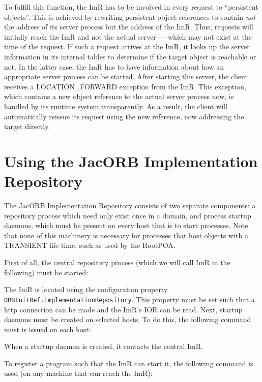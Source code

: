 \documentclass[12pt]{scrbook}
\begin{document}
To fulfill this function, the ImR  has to be involved in every request
to ``persistent  objects''.  This is achieved  by rewriting persistent
object  references to  contain {\em  not}  the address  of its  server
process but  the address  of the ImR.   Thus, requests  will initially
reach the ImR and not the actual server --- which may not exist at the
time of the request. If such a request arrives at the ImR, it looks up
the  server information  in its  internal tables  to determine  if the
target object is reachable or not.  In the latter case, the ImR has to
have  information  about how  an  appropriate  server  process can  be
started.   After   starting  this   server,  the  client   receives  a
LOCATION\_FORWARD  exception  from  the  ImR.  This  exception,  which
contains a new  object reference to the actual  server process now, is
handled by its runtime system  transparently.  As a result, the client
will automatically  reissue its request  using the new  reference, now
addressing the target directly.

\section{Using the JacORB Implementation Repository}

The  JacORB   Implementation  Repository  consists   of  two  separate
components:  a repository  process which  need  only exist  once in  a
domain, and  process startup daemons,  which must be present  on every
host that is  to start processes. Note that none  of this machinery is
necessary for processes that host  objects with a TRANSIENT life time,
such as used by the RootPOA.

First of all, the central repository process (which we will call ImR
in the following) must be started:


The   ImR   is  located   using   the   configuration  property   {\tt
ORBInitRef.ImplementationRepository}.  This property  must be set such
that  a  http  connection  can  be  made and  the  ImR's  IOR  can  be
read. Next, startup  daemons must be created on  selected hosts. To do
this, the following command must is issued on each host:


When a startup  daemon is created, it contacts  the central ImR.

To register  a program such that  the ImR can start  it, the following
command is used (on any machine that can reach the ImR):
\end{document}
